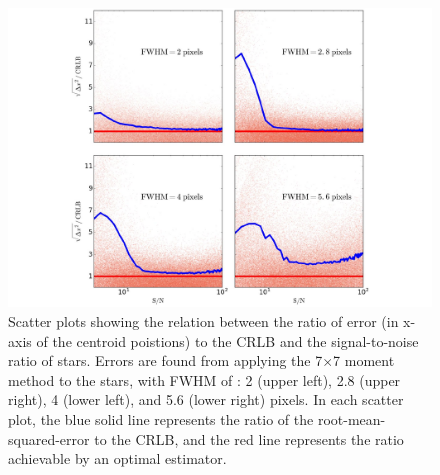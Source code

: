 \begin{figure}[p]~\\
\begin{center}
\includegraphics[width=\linewidth]{figures/centroiding/new_moment.pdf}
\caption{Scatter plots showing the relation between the ratio of error (in x-axis of the centroid poistions) to the CRLB and the signal-to-noise ratio of stars. 
Errors are found from applying the 7$\times$7 moment method to the stars,
with FWHM of : 2 (upper left), 2.8 (upper right), 4 (lower left), and 5.6 (lower right) pixels. In each scatter plot, the blue solid line represents the ratio of the root-mean-squared-error to the CRLB, and the red line represents the ratio achievable by an optimal estimator.}\label{4}
\end{center}
\end{figure}



